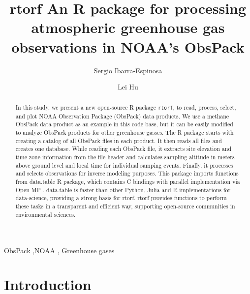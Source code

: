 \documentclass[preprint, 3p,
authoryear]{elsarticle} %
\begin{document}
\begin{frontmatter}

  \title{rtorf An R package for processing atmospheric greenhouse gas
observations in NOAA's ObsPack}
    \author[a,b]{Sergio Ibarra-Espinosa%
  }
    \author[b]{Lei Hu%
  }
  
  \begin{abstract}
  In this study, we present a new open-source R package
  \texttt{rtorf}, to read, process, select, and plot NOAA Observation
  Package (ObsPack) data products. We use a methane ObsPack data product
  as an example in this code base, but it can be easily modified to
  analyze ObsPack products for other greenhouse gasses. The R package
  starts with creating a catalog of all ObsPack files in each product.
  It then reads all files and creates one database. While reading each
  ObsPack file, it extracts site elevation and time zone information
  from the file header and calculates sampling altitude in meters above
  ground level and local time for individual samping events. Finally, it
  processes and selects observations for inverse modeling purposes. This
  package imports functions from data.table R package, which contains C
  bindings with parallel implementation via Open-MP \citep{dt}.
  data.table is faster than other Python, Julia and R implementations
  for data-science, providing a strong basis for rtorf. rtorf
  provides functions to perform these tasks in a transparent and
  efficient way, supporting open-source communities in environmental
  sciences.
  \end{abstract}
    \begin{keyword}
    ObsPack \sep NOAA \sep 
    Greenhouse gases
  \end{keyword}
  
 \end{frontmatter}

\hypertarget{introduction}{%
\section{Introduction}\label{introduction}}
\end{document}
